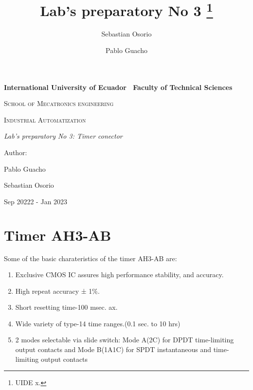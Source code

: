 \documentclass[runningheads]{llncs}
\begin{document}
\begin{titlepage}
    \centering
    {\bfseries\LARGE International University of Ecuador \ 
    Faculty of Technical Sciences  \par}
    \vspace{1cm}
    {\scshape\Large School of Mecatronics engineering \par}
    \vspace{3cm}
    {\scshape\Huge Industrial Automatization \par}
    \vspace{3cm}
    {\itshape\Large Lab's preparatory No 3: Timer conector \par}
    \vfill
    {\Large Author: \par}
    {\Large Pablo Guacho \par Sebastian Osorio \par}
    \vfill
    {\Large Sep 20222 - Jan 2023 \par}
    \end{titlepage}
\newpage

\title{Lab's preparatory No 3 \thanks{UIDE x.}}
\author{Sebastian Osorio \and Pablo Guacho }



\maketitle


\section{Timer AH3-AB }

Some of the basic charateristics of the timer AH3-AB are:
\begin{enumerate}
 \item Exclusive CMOS IC assures high performance stability, and accuracy.
 \item High repeat accuracy ± 1\%.
 \item Short resetting time-100 msec. ax.
\item Wide variety of type-14 time ranges.(0.1 sec. to 10 hrs)
\item 2 modes selectable via slide switch: Mode A(2C) for DPDT time-limiting output contacts and Mode B(1A1C) for SPDT instantaneous and time-limiting output contacts
\end{enumerate}
\end{document}
